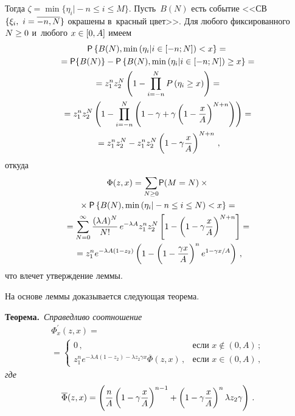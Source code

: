 \begin{multicols}{2}
  Тогда $\zeta=\min \{ \eta_i \vert -n\leq i\leq M\}$. Пусть~$B(N)$ есть событие 
<<СВ $\{\xi_i,\ i\hm= \overline{-n,N}\}$ окрашены в~красный 
цвет>>. Для любого фиксированного $N\hm\geq 0$ и~любого $x\hm\in [0,A]$ 
имеем
  \begin{multline*}
  {\sf P}\left\{ B(N),\min\left( \eta_i\vert i\in [-n;N]\right)<x\right\} ={}\\
  {}={\sf P}\{B(N)\}- {\sf P}\left\{ B(N),\min\left( \eta_i\vert i\in [-n;N]\right) \geq 
x\right\}={}\\
  {}=z_1^n z_2^N \left(1-\prod\limits^N_{i=-n} P\left( \eta_i\geq 
x\right)\right)={}\\
  {}=z_1^n z_2^N\left( 1-\prod^N_{i=-n} \left( 1-\gamma+\gamma\left( 1-
\displaystyle\frac{\displaystyle x\mathstrut}{\displaystyle A\mathstrut}\right)^{N+n}\right)\right)={}\\
  {}= z_1^n z_2^N -z_1^n z_2^N \left(1-\gamma\displaystyle\frac{\displaystyle x\mathstrut}{\displaystyle A\mathstrut}\right)^{N+n}\,,
  \end{multline*}
откуда
\begin{multline*}
\Phi(z,x) =\sum\limits_{N\geq 0} \! {\sf P}(M=N) \times{}\\
{}\times {\sf P}\left\{ B(N),\min \left( \eta_i\vert -
n\leq i\leq N\right) <x\right\}={}\\
{}=
\sum\limits^\infty_{N=0} \displaystyle\frac{\displaystyle (\lambda A)^N\mathstrut}{\displaystyle N!\mathstrut}\,e^{-\lambda A} z_1^n 
z_2^N\left[ 1-\left( 1-\gamma\displaystyle\frac{\displaystyle x\mathstrut}{\displaystyle A\mathstrut}\right)^{N+n}\right]={}\\
{}=
z_1^n e^{-\lambda A(1-z_2)}\left( 1-\left( 1-\displaystyle\frac{\displaystyle \gamma x\mathstrut}{\displaystyle A\mathstrut}\right)^n e^{1-
\gamma x/A}\right)\,,
\end{multline*}
что влечет утверждение леммы. 

\smallskip

  На основе леммы доказывается следующая теорема.
  
  \smallskip
  
  \noindent
  \textbf{Теорема.}\ \textit{Справедливо соотношение}
  \begin{multline*}
  \Phi^\prime_{x} (z,x)={}\\
  {}= \begin{cases}
  0\,, &\!\mbox{если } x\notin (0,A)\,;\\
  z_1^n e^{-\lambda A(1-z_2)-\lambda z_2\gamma x}\overline{\Phi}(z,x)\,, & 
\!\mbox{если } x\in (0,A)\,,
  \end{cases}
  \end{multline*}
\textit{где} 
$$
\overline{\Phi}(z,x)=\left( \displaystyle\frac{\displaystyle n\mathstrut}{\displaystyle A\mathstrut}\left( 1- \gamma\displaystyle\frac{\displaystyle x\mathstrut}{\displaystyle A\mathstrut}\right)^{n-1} +\left( 
1-\gamma\displaystyle\frac{\displaystyle x\mathstrut}{\displaystyle A\mathstrut}\right)^n \lambda z_2 \gamma\right)\,.
$$


\end{multicols}
